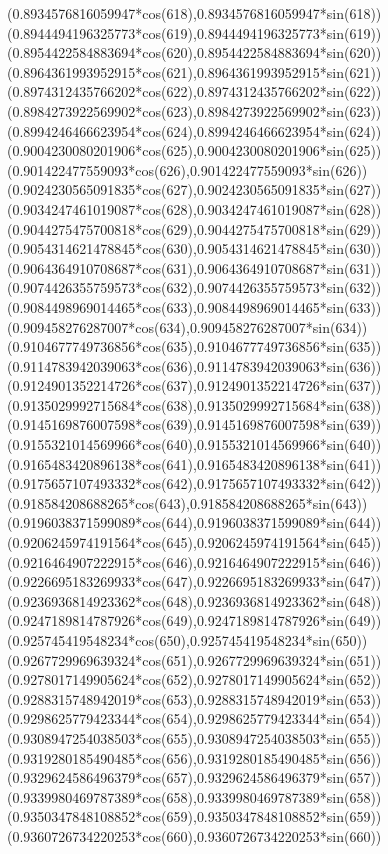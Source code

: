 {({0.8934576816059947*cos(618)},{0.8934576816059947*sin(618)})
({0.8944494196325773*cos(619)},{0.8944494196325773*sin(619)})
({0.8954422584883694*cos(620)},{0.8954422584883694*sin(620)})
({0.8964361993952915*cos(621)},{0.8964361993952915*sin(621)})
({0.8974312435766202*cos(622)},{0.8974312435766202*sin(622)})
({0.8984273922569902*cos(623)},{0.8984273922569902*sin(623)})
({0.8994246466623954*cos(624)},{0.8994246466623954*sin(624)})
({0.9004230080201906*cos(625)},{0.9004230080201906*sin(625)})
({0.901422477559093*cos(626)},{0.901422477559093*sin(626)})
({0.9024230565091835*cos(627)},{0.9024230565091835*sin(627)})
({0.9034247461019087*cos(628)},{0.9034247461019087*sin(628)})
({0.9044275475700818*cos(629)},{0.9044275475700818*sin(629)})
({0.9054314621478845*cos(630)},{0.9054314621478845*sin(630)})
({0.9064364910708687*cos(631)},{0.9064364910708687*sin(631)})
({0.9074426355759573*cos(632)},{0.9074426355759573*sin(632)})
({0.9084498969014465*cos(633)},{0.9084498969014465*sin(633)})
({0.909458276287007*cos(634)},{0.909458276287007*sin(634)})
({0.9104677749736856*cos(635)},{0.9104677749736856*sin(635)})
({0.9114783942039063*cos(636)},{0.9114783942039063*sin(636)})
({0.9124901352214726*cos(637)},{0.9124901352214726*sin(637)})
({0.9135029992715684*cos(638)},{0.9135029992715684*sin(638)})
({0.9145169876007598*cos(639)},{0.9145169876007598*sin(639)})
({0.9155321014569966*cos(640)},{0.9155321014569966*sin(640)})
({0.9165483420896138*cos(641)},{0.9165483420896138*sin(641)})
({0.9175657107493332*cos(642)},{0.9175657107493332*sin(642)})
({0.918584208688265*cos(643)},{0.918584208688265*sin(643)})
({0.9196038371599089*cos(644)},{0.9196038371599089*sin(644)})
({0.9206245974191564*cos(645)},{0.9206245974191564*sin(645)})
({0.9216464907222915*cos(646)},{0.9216464907222915*sin(646)})
({0.9226695183269933*cos(647)},{0.9226695183269933*sin(647)})
({0.9236936814923362*cos(648)},{0.9236936814923362*sin(648)})
({0.9247189814787926*cos(649)},{0.9247189814787926*sin(649)})
({0.925745419548234*cos(650)},{0.925745419548234*sin(650)})
({0.9267729969639324*cos(651)},{0.9267729969639324*sin(651)})
({0.9278017149905624*cos(652)},{0.9278017149905624*sin(652)})
({0.9288315748942019*cos(653)},{0.9288315748942019*sin(653)})
({0.9298625779423344*cos(654)},{0.9298625779423344*sin(654)})
({0.9308947254038503*cos(655)},{0.9308947254038503*sin(655)})
({0.9319280185490485*cos(656)},{0.9319280185490485*sin(656)})
({0.9329624586496379*cos(657)},{0.9329624586496379*sin(657)})
({0.9339980469787389*cos(658)},{0.9339980469787389*sin(658)})
({0.9350347848108852*cos(659)},{0.9350347848108852*sin(659)})
({0.9360726734220253*cos(660)},{0.9360726734220253*sin(660)})
}
